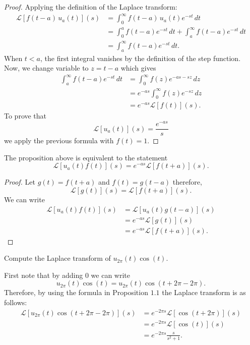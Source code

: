 \documentclass[12pt, a4paper]{article}
\newcommand{\CL}{\mathcal{L}}
\begin{document}
\begin{proof}
    Applying the definition of the Laplace transform: 
    \[\begin{aligned}
        \CL \left[ f(t-a) \, u_a(t) \right](s) &= \int_{0}^{\infty} f(t-a) \, u_a(t) e^{-st} \, dt \\ 
        &= \int_{0}^{a} f(t-a) e^{-st} \, dt + \int_{a}^{\infty} f(t-a) e^{-st} \, dt \\
        &= \int_{a}^{\infty} f(t-a) e^{-st} \, dt.
    \end{aligned}\]
    When \(t<a\), the first integral vanishes by the definition of the step function. Now, we change variable to \(z = t-a\) which gives 
    \[\begin{aligned}
        \int_a^{\infty} f(t-a) e^{-st} \, dt &= \int_{0}^{\infty} f(z) e^{-as-sz} \, dz \\
        &= e^{-as} \int_{0}^{\infty} f(z) e^{-sz} \, dz \\
        &= e^{-as} \CL[f(t)](s).
    \end{aligned}\]
    To prove that 
    \[\CL\left[ u_a(t) \right](s) = \frac{e^{-as}}{s}\]
    we apply the previous formula with \(f(t)=1\).
\end{proof}

\begin{corollary}
    The proposition above is equivalent to the statement 
    \[\CL[u_a(t)f(t)](s) = e^{-as}\CL[f(t+a)](s).\]
\end{corollary}

\begin{proof}
    Let \(g(t)=f(t+a)\) and \(f(t)=g(t-a)\) therefore,
    \[\CL[g(t)](s)=\CL[f(t+a)](s).\]
    We can write 
    \[\begin{aligned}
        \CL[u_a(t)f(t)](s) &= \CL[u_a(t)g(t-a)](s) \\
        &= e^{-as} \CL[g(t)](s) \\
        &= e^{-as}\CL[f(t+a)](s).
    \end{aligned}\]
\end{proof}

\begin{mdexample}
    Compute the Laplace transform of \(u_{2\pi}(t) \cos(t)\).
    \begin{solution}
        First note that by adding \(0\) we can write
        \[u_{2\pi}(t)\cos(t)= u_{2\pi}(t)\cos(t+2\pi-2\pi).\]
        Therefore, by using the formula in Proposition \(1.1\) the Laplace transform is as follows:
        \[\begin{aligned}
            \CL[u_{2\pi}(t)\cos(t+2\pi-2\pi)](s) &= e^{-2\pi s}\CL[\cos(t+2\pi)](s) \\
            &= e^{-2\pi s}\CL[\cos(t)](s) \\
            &= e^{-2\pi s} \frac{s}{s^2+1}.
        \end{aligned}\]
    \end{solution}
\end{mdexample}
\end{document}

